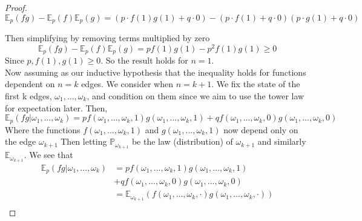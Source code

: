 \documentclass[a4paper,11pt]{article}
\theoremstyle{definition}
\newcommand{\expp}{\mathbb{E}_p}
\begin{document}
\begin{proof}
	$$\expp(fg) - \expp(f)\expp(g) = (p \cdot f(1)g(1) + q \cdot  0) - (p \cdot f(1) + q \cdot 0)(p \cdot g(1) + q \cdot 0) $$
	
	Then simplifying by removing terms multiplied by zero
	$$\expp(fg) - \expp(f)\expp(g) = pf(1)g(1) - p^2f(1)g(1) \geq 0$$
	Since $p,f(1),g(1) \geq 0$.
	So the result holds for $n=1$.\\
	Now assuming as our inductive hypothesis that the inequality holds for functions dependent on $n = k$ edges.
	We consider when $ n = k+1$.
	We fix the state of the first k edges, $\omega_1,...,\omega_k$, and condition on them since we aim to use the tower law for expectation later.
	Then,
	$$\expp(fg|\omega_1,...,\omega_k) = p f(\omega_1,...,\omega_k,1)g(\omega_1,...,\omega_k,1)
	+ qf(\omega_1,...,\omega_k,0)g(\omega_1,...,\omega_k,0)$$
	Where the functions $f(\omega_1,...,\omega_k,1)$ and $g(\omega_1,...,\omega_k,1)$ now depend only on the edge $\omega_{k+1}$
	Then letting $ \mathbb{P}_{\omega_{k+1}}$ be the law (distribution) of $\omega_{k+1}$ and similarly $\mathbb{E}_{\omega_{k+1}}$.
	We see that 
	\begin{align*}
		\expp(fg|\omega_1,...,\omega_k) &= p f(\omega_1,...,\omega_k,1)g(\omega_1,...,\omega_k,1)\\
	&+ qf(\omega_1,...,\omega_k,0)g(\omega_1,...,\omega_k,0)\\
	&= \mathbb{E}_{\omega_{k+1}}(f(\omega_1,...,\omega_k,\cdot)g(\omega_1,...,\omega_k,\cdot))\\
	\end{align*}


\end{proof}
\end{document}
